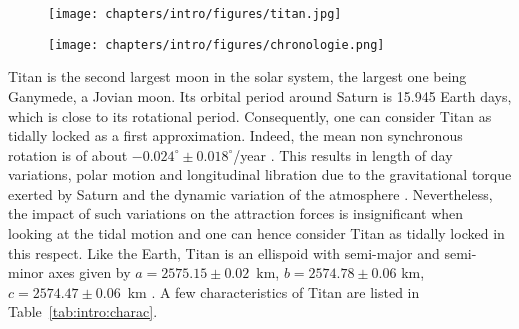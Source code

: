 \begin{figure}
\begin{center}
\texttt{[image: chapters/intro/figures/titan.jpg]}
\end{center}
\end{figure}
\begin{figure}
\begin{center}
\texttt{[image: chapters/intro/figures/chronologie.png]}
\end{center}
\end{figure}
Titan is the second largest moon in the solar system, the largest one being Ganymede, a Jovian moon. Its orbital period around Saturn is 15.945 Earth days, which is close to its rotational period. Consequently, one can consider Titan as tidally locked as a first approximation. Indeed, the mean non synchronous rotation is of about $-0.024^\circ\pm0.018^\circ$/year \citep{meriggiola2016rotational}. This results in length of day variations, polar motion and longitudinal libration due to the gravitational torque exerted by Saturn and the dynamic variation of the atmosphere \citep{coyette2018variations}. Nevertheless, the impact of such variations on the attraction forces is insignificant when looking at the tidal motion and one can hence consider Titan as tidally locked in this respect. Like the Earth, Titan is an ellispoid with semi-major and semi-minor axes given by $a =2575.15\pm0.02$~km, $b =2574.78\pm0.06$ km, $c =2574.47\pm0.06$~km \citep{zebker2009size}. A few characteristics of Titan are listed in Table~\ref{tab:intro:charac}. 
